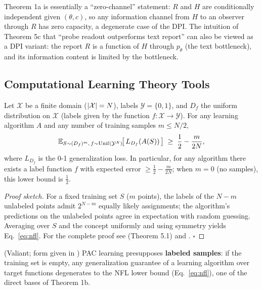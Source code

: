 \begin{remark}
Theorem 1a is essentially a ``zero-channel'' statement: $R$ and $H$ are conditionally
independent given $(\theta,c)$, so any information channel from $H$ to an observer through
$R$ has zero capacity, a degenerate case of the DPI. The intuition of Theorem 5c that
``probe readout outperforms text report'' can also be viewed as a DPI variant: the report $R$
is a function of $H$ through $p_\theta$ (the text bottleneck), and its information content is
limited by the bottleneck.
\end{remark}

\subsection{Computational Learning Theory Tools}

\begin{restate}
Let $\mathcal{X}$ be a finite domain ($\left\lvert \mathcal{X} \right\rvert = N$), labels
$\mathcal{Y} = \{0,1\}$, and $D_f$ the uniform distribution on $\mathcal{X}$ (labels given
by the function $f: \mathcal{X} \to \mathcal{Y}$). For any learning algorithm $A$ and any
number of training samples $m \le N/2$,
\begin{equation}
\mathbb{E}_{S \sim (D_f)^m,\, f \sim \mathrm{Unif}(\mathcal{Y}^{\mathcal{X}})}\!\!\left[\, L_{D_f}(A(S)) \,\right] \;\ge\; \frac12 - \frac{m}{2N},
\label{eq:nfl}
\end{equation}
where $L_{D_f}$ is the 0-1 generalization loss. In particular, for any algorithm there exists
a label function $f$ with expected error $\ge \tfrac12 - \tfrac{m}{2N}$; when $m = 0$ (no
samples), this lower bound is $\tfrac12$.
\end{restate}

\begin{proof}[Proof sketch]
For a fixed training set $S$ ($m$ points), the labels of the $N - m$ unlabeled points admit
$2^{N-m}$ equally likely assignments; the algorithm's predictions on the unlabeled points
agree in expectation with random guessing. Averaging over $S$ and the concept uniformly and
using symmetry yields Eq.~\eqref{eq:nfl}. For the complete proof see \cite{shalev-shwartz-2014}
(Theorem 5.1) and \cite{wolpert-macready-1997}. $\square$
\end{proof}

\begin{remark}\label{thm:pac}
(Valiant\cite{valiant-1984}; form given in \cite{shalev-shwartz-2014}) PAC learning
presupposes \textbf{labeled samples}: if the training set is empty, any generalization
guarantee of a learning algorithm over target functions degenerates to the NFL lower bound
(Eq.~\eqref{eq:nfl}), one of the direct bases of Theorem 1b.
\end{remark}

